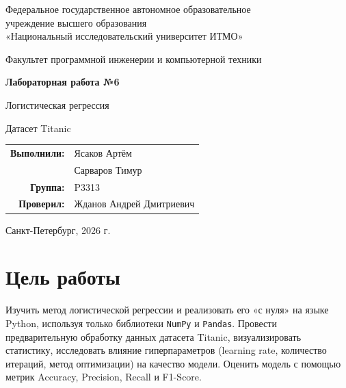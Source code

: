 \documentclass[12pt,a4paper]{article}
\newcommand{\AuthorA}{Ясаков Артём}
\newcommand{\AuthorB}{Сарваров Тимур}
\newcommand{\Group}{P3313}
\newcommand{\Teacher}{Жданов Андрей Дмитриевич}
\begin{document}
\begin{titlepage}
    \centering
    {\large Федеральное государственное автономное образовательное\\
    учреждение высшего образования\\
    «Национальный исследовательский университет ИТМО»\par}
    {\large Факультет программной инженерии и компьютерной техники\par}
    \vspace{2.5cm}
    {\Huge\bfseries Лабораторная работа №6\par}
    \vspace{0.4cm}
    {\Large Логистическая регрессия\par}
    \vspace{0.4cm}
    {\Large Датасет Titanic\par}
    \vspace{4cm}
    \begin{flushright}
    \begin{tabular}{rl}
        \textbf{Выполнили:} & \AuthorA \\
                            & \AuthorB \\[6pt]
        \textbf{Группа:}    & \Group \\[12pt]
        \textbf{Проверил:}  & \Teacher \\
    \end{tabular}
    \end{flushright}
    \vfill
    {\large Санкт-Петербург, 2026 г.\par}
\end{titlepage}

\tableofcontents
\newpage

\section{Цель работы}

Изучить метод логистической регрессии и реализовать его «с нуля»
на языке Python, используя только библиотеки \texttt{NumPy}
и \texttt{Pandas}. Провести предварительную обработку данных
датасета Titanic, визуализировать статистику, исследовать влияние
гиперпараметров (learning rate, количество итераций, метод
оптимизации) на качество модели. Оценить модель с помощью метрик
Accuracy, Precision, Recall и F1-Score.

\end{document}
